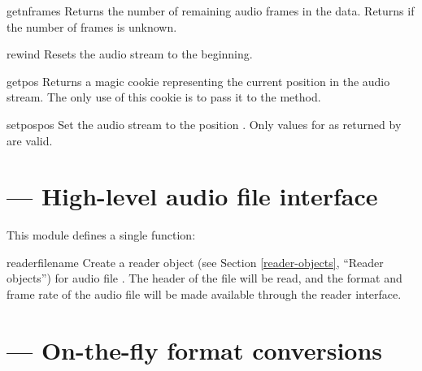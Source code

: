 \begin{methoddesc}{getnframes}{}
Returns the number of remaining audio frames in the data.  Returns 
if the number of frames is unknown.
\end{methoddesc}

\begin{methoddesc}{rewind}{}
Resets the audio stream to the beginning.
\end{methoddesc}

\begin{methoddesc}{getpos}{}
Returns a magic cookie representing the current position in the audio
stream.  The only use of this cookie is to pass it to the
 method.
\end{methoddesc}

\begin{methoddesc}{setpos}{pos}
Set the audio stream to the position .  Only values for
 as returned by  are valid.
\end{methoddesc}


\section{
         --- High-level audio file interface}


This module defines a single function:

\begin{funcdesc}{reader}{filename}
Create a reader object (see Section \ref{reader-objects}, ``Reader
objects'') for audio file .  The header of the file will
be read, and the format and frame rate of the audio file will be made
available through the reader interface.
\end{funcdesc}


\section{
         --- On-the-fly format conversions}


